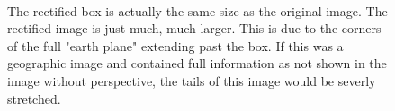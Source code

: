 \documentclass[12pt]{report}
\begin{document}
\begin{figure}[!h]
\centering
{}
\hspace{1mm}
\\
\caption{The rectified box is actually the same size as the original image. The rectified image is just much, much larger. 
         This is due to the corners of the full "earth plane" extending past the box.  If this
         was a geographic image and contained full information as not shown in the image without perspective, the tails of
         this image would be severly stretched.}
\end{figure}
\end{document}
